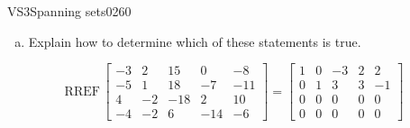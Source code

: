 \begin{exercise}{VS3}{Spanning sets}{0260}
\begin{exerciseStatement}
\begin{enumerate}[(a)]
\begin{itemize}
 The set of vectors \(\left\{ \left[\begin{array}{c}
-3 \\
-5 \\
4 \\
-4
\end{array}\right] , \left[\begin{array}{c}
2 \\
1 \\
-2 \\
-2
\end{array}\right] , \left[\begin{array}{c}
15 \\
18 \\
-18 \\
6
\end{array}\right] , \left[\begin{array}{c}
0 \\
-7 \\
2 \\
-14
\end{array}\right] , \left[\begin{array}{c}
-8 \\
-11 \\
10 \\
-6
\end{array}\right] \right\}\) does \textbf{not} span \(\mathbb R^4\). 

 
\end{itemize}

     
\item  

 Explain how to determine which of these statements is true. 

 
\end{enumerate}

     \end{exerciseStatement}
 \begin{exerciseAnswer} 

 \[
\mathrm{RREF}\, \left[\begin{array}{ccccc}
-3 & 2 & 15 & 0 & -8 \\
-5 & 1 & 18 & -7 & -11 \\
4 & -2 & -18 & 2 & 10 \\
-4 & -2 & 6 & -14 & -6
\end{array}\right] = \left[\begin{array}{ccccc}
1 & 0 & -3 & 2 & 2 \\
0 & 1 & 3 & 3 & -1 \\
0 & 0 & 0 & 0 & 0 \\
0 & 0 & 0 & 0 & 0
\end{array}\right]
            \] 


\end{exerciseAnswer}
\end{exercise}

